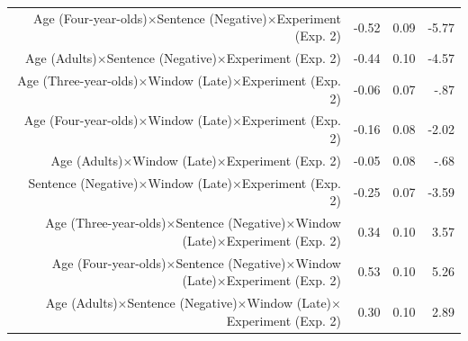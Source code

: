 \documentclass[man]{apa2}
\begin{document}
\begin{table}
\begin{center}
\begin{tabular}{rrrr}
  Age (Four-year-olds)$\times$Sentence (Negative)$\times$Experiment (Exp. 2)  & -0.52 & 0.09 & -5.77 \\ 
  Age (Adults)$\times$Sentence (Negative)$\times$Experiment (Exp. 2) & -0.44 & 0.10 & -4.57 \\ 
  Age (Three-year-olds)$\times$Window (Late)$\times$Experiment (Exp. 2)  & -0.06 & 0.07 & -.87 \\ 
  Age (Four-year-olds)$\times$Window (Late)$\times$Experiment (Exp. 2)  & -0.16 & 0.08 & -2.02 \\ 
  Age (Adults)$\times$Window (Late)$\times$Experiment (Exp. 2)  & -0.05 & 0.08 & -.68 \\ 
 Sentence (Negative)$\times$Window (Late)$\times$Experiment (Exp. 2)  & -0.25 & 0.07 & -3.59 \\ 
  Age (Three-year-olds)$\times$Sentence (Negative)$\times$Window (Late)$\times$Experiment (Exp. 2)  & 0.34 & 0.10 & 3.57 \\ 
  Age (Four-year-olds)$\times$Sentence (Negative)$\times$Window (Late)$\times$Experiment (Exp. 2)  & 0.53 & 0.10 & 5.26 \\ 
  Age (Adults)$\times$Sentence (Negative)$\times$Window (Late)$\times$Experiment (Exp. 2) & 0.30 & 0.10 & 2.89 \\ 
   \hline
\end{tabular}
\end{center}
\end{table}
\doublespacing
\end{document}
